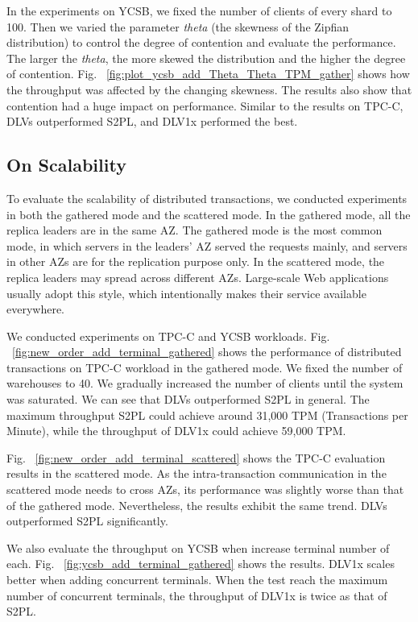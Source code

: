 \documentclass[conference]{IEEEtran}
\begin{document}
In the experiments on YCSB, we fixed the number of clients of every shard to 100.
Then we varied the parameter \emph{theta} (the skewness of the Zipfian distribution) to control the degree of contention and evaluate the performance.
The larger the \emph{theta}, the more skewed the distribution and the higher the degree of contention. 
Fig. ~\ref{fig:plot_ycsb_add_Theta_Theta_TPM_gather} shows how the throughput was affected by the changing skewness.
The results also show that contention had a huge impact on performance.
Similar to the results on TPC-C, DLVs outperformed S2PL, and DLV1x performed the best.

\subsection{On Scalability}

To evaluate the scalability of distributed transactions, we conducted experiments in both the gathered mode and the scattered mode.
In the gathered mode, all the replica leaders are in the same AZ. 
The gathered mode is the most common mode, in which servers in the leaders' AZ served the requests mainly, and servers in other AZs are for the replication purpose only. 
In the scattered mode, the replica leaders may spread across different AZs. 
Large-scale Web applications usually adopt this style, which intentionally makes their service available everywhere.

We conducted experiments on TPC-C and YCSB workloads. 
Fig. ~\ref{fig:new_order_add_terminal_gathered} shows the performance of distributed transactions on TPC-C workload in the gathered mode.
We fixed the number of warehouses to 40. 
We gradually increased the number of clients until the system was saturated. 
We can see that DLVs outperformed S2PL in general. 
The maximum throughput S2PL could achieve around 31,000 TPM (Transactions per Minute), 
while the throughput of DLV1x could achieve 59,000 TPM.



Fig. ~\ref{fig:new_order_add_terminal_scattered}  shows the TPC-C evaluation results in the scattered mode. 
As the intra-transaction communication in the scattered mode needs to cross AZs, its performance was slightly worse than that of the gathered mode.
Nevertheless, the results exhibit the same trend. DLVs outperformed S2PL significantly.

We also evaluate the throughput on YCSB when increase terminal number of each.
Fig. ~\ref{fig:ycsb_add_terminal_gathered} shows the results.
DLV1x scales better when adding concurrent terminals.
When the test reach the maximum number of concurrent terminals, the throughput of DLV1x is twice as that of S2PL.
\end{document}
